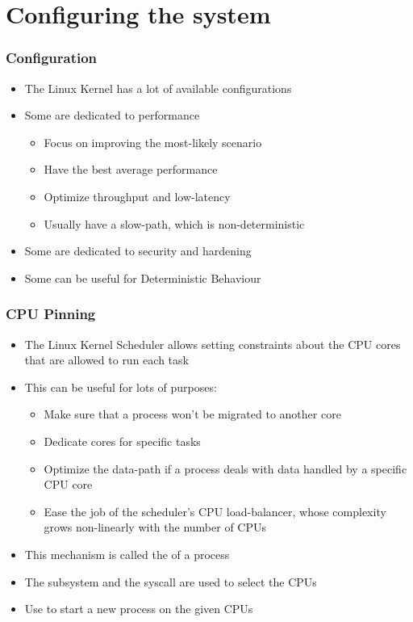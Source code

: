 \section{Configuring the system}

\begin{frame}
        \frametitle{Configuration}
        \begin{itemize}
                \item The Linux Kernel has a lot of available configurations
                \item Some are dedicated to performance
                        \begin{itemize}
                                \item Focus on improving the most-likely scenario
                                \item Have the best average performance
                                \item Optimize throughput and low-latency
                                \item Usually have a slow-path, which is non-deterministic
                        \end{itemize}
                \item Some are dedicated to security and hardening
                \item Some can be useful for Deterministic Behaviour
        \end{itemize}
\end{frame}

\begin{frame}
        \frametitle{CPU Pinning}
        \begin{itemize}
                \item The Linux Kernel Scheduler allows setting constraints about the CPU cores that are allowed
                        to run each task
                \item This can be useful for lots of purposes:
                        \begin{itemize}
                                \item Make sure that a process won't be migrated to another core
                                \item Dedicate cores for specific tasks
                                \item Optimize the data-path if a process deals with data handled by a specific CPU core
                                \item Ease the job of the scheduler's CPU load-balancer, whose complexity grows non-linearly with the number of CPUs
                        \end{itemize}
                \item This mechanism is called the  of a process
                \item The  subsystem and the  syscall are used to select the CPUs
                \item Use  to start a new process on the given CPUs
        \end{itemize}
\end{frame}

